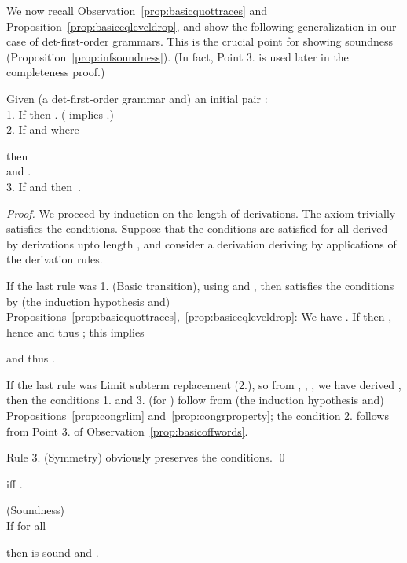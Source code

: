 \documentclass[12pt]{article}
\begin{document}
We now recall Observation~\ref{prop:basicquottraces}
and Proposition~\ref{prop:basiceqleveldrop}, 
and show the following generalization  
in our case of det-first-order grammars.
This is the crucial point for showing
soundness (Proposition~\ref{prop:infsoundness}).
(In fact, Point 3. is used later 
 in the 
 completeness proof.)

\begin{prop}\label{prop:indsound}
Given (a det-first-order grammar  and) an initial pair :
\\
1. If   then 
.
( implies .)
\\
2. If   and  where 
 
then
\\
\hspace*{2em}
and
.
\\
3.
If  and  then
\,.
\end{prop}
\begin{proof}
We proceed by induction on the length of derivations.
The axiom  trivially satisfies the
conditions. Suppose that the conditions are satisfied for 
all  derived by derivations upto length , and
consider a derivation deriving   by  applications
of the derivation rules. 

If the last rule was 1. (Basic transition),
using  and , 
then  satisfies the conditions by (the induction
hypothesis and) 
Propositions~\ref{prop:basicquottraces},~\ref{prop:basiceqleveldrop}:
We have . If  
 then ,
hence  and thus
;
this implies

and thus .

If the last rule was Limit subterm replacement (2.),
so from , ,
  ,  we have derived
,
then
the conditions 1. and 3. (for  ) 
follow from (the induction hypothesis and)
Propositions~\ref{prop:congrlim} 
and~\ref{prop:congrproperty};  the condition 2. follows
from Point 3. of Observation~\ref{prop:basicoffwords}.

Rule 3. (Symmetry) obviously preserves the conditions. 
\qed
\end{proof}


\begin{cor}
 iff .
\end{cor}



\begin{prop}\label{prop:infsoundness}(Soundness)
\\
If  for all

then  is sound and .
\end{prop}
\end{document}

